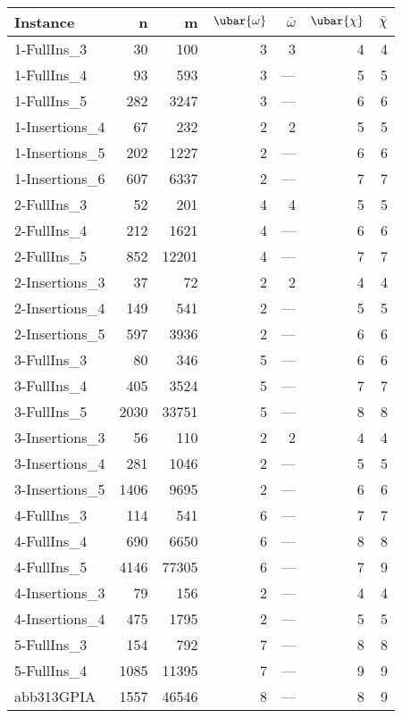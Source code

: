 \begingroup\footnotesize
\begin{longtable}{lrrrrrr}
  \toprule
  Instance & n & m & $\ubar{\omega}$ & $\bar{\omega}$ & $\ubar{\chi}$ & $\bar{\chi}$ \\ \midrule
1-FullIns\_3 & 30 & 100 & 3 & 3 & 4 & 4 \\ 
  1-FullIns\_4 & 93 & 593 & 3 & --- & 5 & 5 \\ 
  1-FullIns\_5 & 282 & 3247 & 3 & --- & 6 & 6 \\ 
  1-Insertions\_4 & 67 & 232 & 2 & 2 & 5 & 5 \\ 
  1-Insertions\_5 & 202 & 1227 & 2 & --- & 6 & 6 \\ 
  1-Insertions\_6 & 607 & 6337 & 2 & --- & 7 & 7 \\ 
  2-FullIns\_3 & 52 & 201 & 4 & 4 & 5 & 5 \\ 
  2-FullIns\_4 & 212 & 1621 & 4 & --- & 6 & 6 \\ 
  2-FullIns\_5 & 852 & 12201 & 4 & --- & 7 & 7 \\ 
  2-Insertions\_3 & 37 & 72 & 2 & 2 & 4 & 4 \\ 
  2-Insertions\_4 & 149 & 541 & 2 & --- & 5 & 5 \\ 
  2-Insertions\_5 & 597 & 3936 & 2 & --- & 6 & 6 \\ 
  3-FullIns\_3 & 80 & 346 & 5 & --- & 6 & 6 \\ 
  3-FullIns\_4 & 405 & 3524 & 5 & --- & 7 & 7 \\ 
  3-FullIns\_5 & 2030 & 33751 & 5 & --- & 8 & 8 \\ 
  3-Insertions\_3 & 56 & 110 & 2 & 2 & 4 & 4 \\ 
  3-Insertions\_4 & 281 & 1046 & 2 & --- & 5 & 5 \\ 
  3-Insertions\_5 & 1406 & 9695 & 2 & --- & 6 & 6 \\ 
  4-FullIns\_3 & 114 & 541 & 6 & --- & 7 & 7 \\ 
  4-FullIns\_4 & 690 & 6650 & 6 & --- & 8 & 8 \\ 
  4-FullIns\_5 & 4146 & 77305 & 6 & --- & 7 & 9 \\ 
  4-Insertions\_3 & 79 & 156 & 2 & --- & 4 & 4 \\ 
  4-Insertions\_4 & 475 & 1795 & 2 & --- & 5 & 5 \\ 
  5-FullIns\_3 & 154 & 792 & 7 & --- & 8 & 8 \\ 
  5-FullIns\_4 & 1085 & 11395 & 7 & --- & 9 & 9 \\ 
  abb313GPIA & 1557 & 46546 & 8 & --- & 8 & 9 \\ 

\end{longtable}

